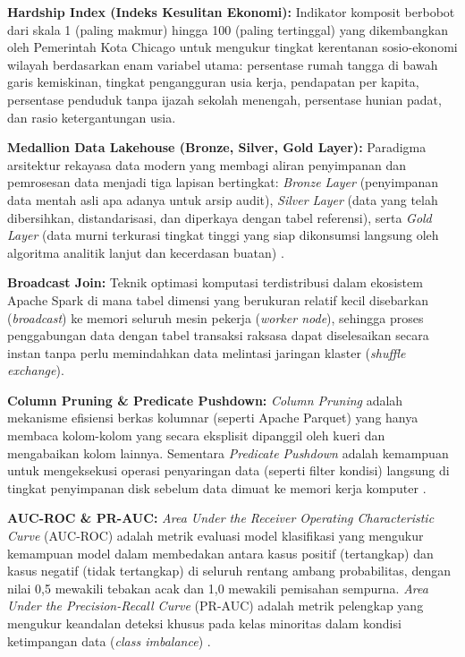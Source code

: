 \documentclass[11pt,a4paper]{article}
\begin{document}
\textbf{Hardship Index (Indeks Kesulitan Ekonomi):} Indikator komposit berbobot dari skala 1 (paling makmur) hingga 100 (paling tertinggal) yang dikembangkan oleh Pemerintah Kota Chicago untuk mengukur tingkat kerentanan sosio-ekonomi wilayah berdasarkan enam variabel utama: persentase rumah tangga di bawah garis kemiskinan, tingkat pengangguran usia kerja, pendapatan per kapita, persentase penduduk tanpa ijazah sekolah menengah, persentase hunian padat, dan rasio ketergantungan usia.

\textbf{Medallion Data Lakehouse (Bronze, Silver, Gold Layer):} Paradigma arsitektur rekayasa data modern yang membagi aliran penyimpanan dan pemrosesan data menjadi tiga lapisan bertingkat: \textit{Bronze Layer} (penyimpanan data mentah asli apa adanya untuk arsip audit), \textit{Silver Layer} (data yang telah dibersihkan, distandarisasi, dan diperkaya dengan tabel referensi), serta \textit{Gold Layer} (data murni terkurasi tingkat tinggi yang siap dikonsumsi langsung oleh algoritma analitik lanjut dan kecerdasan buatan) \cite{zaharia2012}.

\textbf{Broadcast Join:} Teknik optimasi komputasi terdistribusi dalam ekosistem Apache Spark di mana tabel dimensi yang berukuran relatif kecil disebarkan (\textit{broadcast}) ke memori seluruh mesin pekerja (\textit{worker node}), sehingga proses penggabungan data dengan tabel transaksi raksasa dapat diselesaikan secara instan tanpa perlu memindahkan data melintasi jaringan klaster (\textit{shuffle exchange}).

\textbf{Column Pruning \& Predicate Pushdown:} \textit{Column Pruning} adalah mekanisme efisiensi berkas kolumnar (seperti Apache Parquet) yang hanya membaca kolom-kolom yang secara eksplisit dipanggil oleh kueri dan mengabaikan kolom lainnya. Sementara \textit{Predicate Pushdown} adalah kemampuan untuk mengeksekusi operasi penyaringan data (seperti filter kondisi) langsung di tingkat penyimpanan disk sebelum data dimuat ke memori kerja komputer \cite{zaharia2012}.

\textbf{AUC-ROC \& PR-AUC:} \textit{Area Under the Receiver Operating Characteristic Curve} (AUC-ROC) adalah metrik evaluasi model klasifikasi yang mengukur kemampuan model dalam membedakan antara kasus positif (tertangkap) dan kasus negatif (tidak tertangkap) di seluruh rentang ambang probabilitas, dengan nilai 0,5 mewakili tebakan acak dan 1,0 mewakili pemisahan sempurna. \textit{Area Under the Precision-Recall Curve} (PR-AUC) adalah metrik pelengkap yang mengukur keandalan deteksi khusus pada kelas minoritas dalam kondisi ketimpangan data (\textit{class imbalance}) \cite{mandalapu2023, djon2023}.
\end{document}
